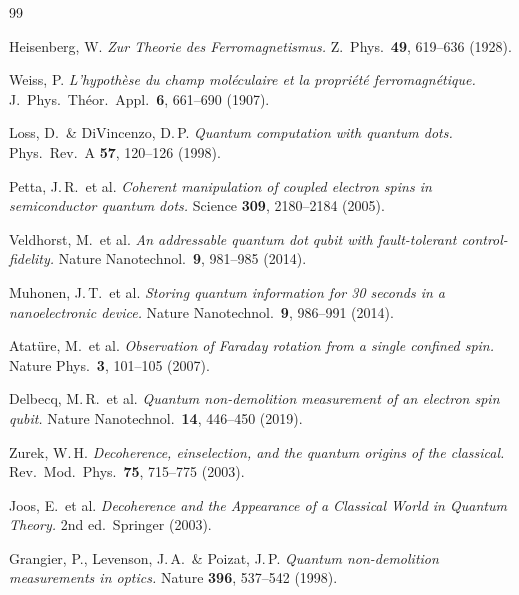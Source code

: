 \begin{thebibliography}{99}

Heisenberg, W.
\textit{Zur Theorie des Ferromagnetismus.}
Z.\ Phys.\ \textbf{49}, 619--636 (1928).

Weiss, P.
\textit{L'hypothèse du champ moléculaire et la propriété ferromagnétique.}
J.\ Phys.\ Théor.\ Appl.\ \textbf{6}, 661--690 (1907).

Loss, D.\ \& DiVincenzo, D.\,P.
\textit{Quantum computation with quantum dots.}
Phys.\ Rev.\ A \textbf{57}, 120--126 (1998).

Petta, J.\,R.\ et al.
\textit{Coherent manipulation of coupled electron spins in semiconductor
quantum dots.}
Science \textbf{309}, 2180--2184 (2005).

Veldhorst, M.\ et al.
\textit{An addressable quantum dot qubit with fault-tolerant control-fidelity.}
Nature Nanotechnol.\ \textbf{9}, 981--985 (2014).

Muhonen, J.\,T.\ et al.
\textit{Storing quantum information for 30 seconds in a nanoelectronic device.}
Nature Nanotechnol.\ \textbf{9}, 986--991 (2014).

Atatüre, M.\ et al.
\textit{Observation of Faraday rotation from a single confined spin.}
Nature Phys.\ \textbf{3}, 101--105 (2007).

Delbecq, M.\,R.\ et al.
\textit{Quantum non-demolition measurement of an electron spin qubit.}
Nature Nanotechnol.\ \textbf{14}, 446--450 (2019).

Zurek, W.\,H.
\textit{Decoherence, einselection, and the quantum origins of the classical.}
Rev.\ Mod.\ Phys.\ \textbf{75}, 715--775 (2003).

Joos, E.\ et al.
\textit{Decoherence and the Appearance of a Classical World in Quantum Theory.}
2nd ed.\ Springer (2003).

Grangier, P., Levenson, J.\,A.\ \& Poizat, J.\,P.
\textit{Quantum non-demolition measurements in optics.}
Nature \textbf{396}, 537--542 (1998).

\end{thebibliography}

